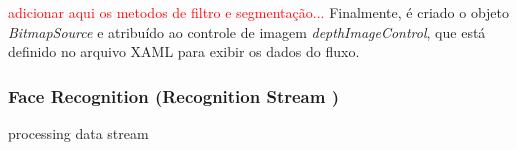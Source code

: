 \textcolor{red}{adicionar aqui os metodos de filtro e segmentação...}
Finalmente, é criado o objeto \textit{BitmapSource} e atribuído ao controle de imagem \textit{depthImageControl}, que está definido no arquivo XAML para exibir os dados do fluxo.




\subsubsection{Face Recognition (Recognition Stream )}\label{sec:depthDataRecognition}
processing data stream